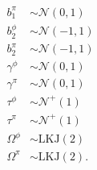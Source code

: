 \documentclass[12pt,letterpaper]{article}
\begin{document}
\begin{equation}
\begin{split}
    b^{\pi}_{1} &\sim \mathcal{N}(0, 1) \\
    b^{\phi}_{2} &\sim \mathcal{N}(-1, 1) \\
    b^{\pi}_{2} &\sim \mathcal{N}(-1, 1) \\
    \gamma^{\phi} &\sim \mathcal{N}(0, 1) \\
    \gamma^{\pi} &\sim \mathcal{N}(0, 1) \\
    \tau^{\phi} &\sim \mathcal{N}^{+}(1) \\
    \tau^{\pi} &\sim \mathcal{N}^{+}(1) \\
    \Omega^{\phi} &\sim \text{LKJ}(2) \\
    \Omega^{\pi} &\sim \text{LKJ}(2). \\
  \end{split}
  \label{eq:birth_death}
\end{equation}
\end{document}
